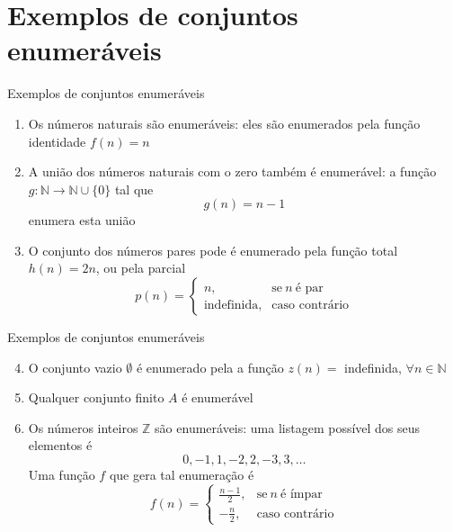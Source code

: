 \section{Exemplos de conjuntos enumeráveis}

\begin{frame}[fragile]{Exemplos de conjuntos enumeráveis}

    \begin{enumerate}
        \item Os números naturais são enumeráveis: eles são enumerados pela função identidade
            $f(n) = n$

        \item A união dos números naturais com o zero também é enumerável: a função 
            $g:\mathbb{N}\to \mathbb{N}\cup \lbrace 0\rbrace$ tal que
            \[
                g(n) = n - 1
            \]
            enumera esta união

        \item O conjunto dos números pares pode é enumerado pela função total $h(n) = 2n$, ou
            pela parcial
            \[
                p(n) = \left\lbrace \begin{array}{ll}
                            n, & \mbox{se}\ n\ \mbox{é par} \\
                            \mbox{indefinida}, & \mbox{caso contrário}
                        \end{array}\right.
            \]
    \end{enumerate}

\end{frame}

\begin{frame}[fragile]{Exemplos de conjuntos enumeráveis}

    \begin{enumerate}
        \setcounter{enumi}{3}
        \item O conjunto vazio $\emptyset$ é enumerado pela a função $z(n) =$ indefinida,
            $\forall n\in \mathbb{N}$ 

        \item Qualquer conjunto finito $A$ é enumerável

        \item Os números inteiros $\mathbb{Z}$ são enumeráveis: uma listagem possível dos seus
        elementos é
        \[
            0, -1, 1, -2, 2, -3, 3, \ldots
        \]
        Uma função $f$ que gera tal enumeração é 
        \[
            f(n) = \left\lbrace \begin{array}{ll}
                        \frac{n - 1}{2}, & \mbox{se}\ n\ \mbox{é ímpar} \\
                        -\frac{n}{2}, & \mbox{caso contrário}
                    \end{array}\right.
        \]

    \end{enumerate}

\end{frame}


